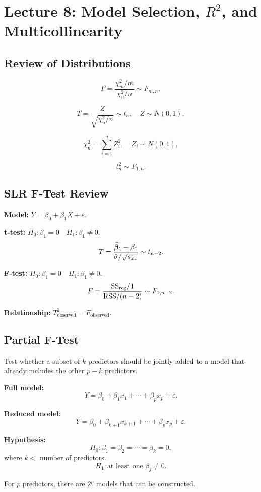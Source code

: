 \section{Lecture 8: Model Selection, $R^2$, and Multicollinearity}

\subsection{Review of Distributions}

\[
F = \frac{\chi^2_m / m}{\chi^2_n / n} \sim F_{m,n},
\]

\[
T = \frac{Z}{\sqrt{\chi^2_n / n}} \sim t_n, \quad Z \sim N(0,1),
\]

\[
\chi^2_n = \sum_{i=1}^n Z_i^2, \quad Z_i \sim N(0,1),
\]

\[
t_n^2 \sim F_{1,n}.
\]

\subsection{SLR F-Test Review}

\textbf{Model:} $Y = \beta_0 + \beta_1 X + \varepsilon$.

\textbf{t-test:} $H_0: \beta_1 = 0 \quad H_1: \beta_1 \neq 0$.
\[
T = \frac{\widehat{\boldsymbol{\beta}}_1 - \beta_1}{\hat{\sigma}/\sqrt{s_{xx}}} \sim t_{n-2}.
\]

\textbf{F-test:} $H_0: \beta_1 = 0 \quad H_1: \beta_1 \neq 0$.
\[
F = \frac{\mathrm{SS}_{\mathrm{reg}}/1}{\mathrm{RSS}/(n-2)} \sim F_{1,n-2}.
\]

\textbf{Relationship:} $T_{\text{observed}}^2 = F_{\text{observed}}$.

\subsection{Partial F-Test}

Test whether a subset of $k$ predictors should be jointly added to a model that already includes the other $p - k$ predictors.

\textbf{Full model:}
\[
Y = \beta_0 + \beta_1 x_1 + \cdots + \beta_p x_p + \varepsilon.
\]

\textbf{Reduced model:}
\[
Y = \beta_0 + \beta_{k+1} x_{k+1} + \cdots + \beta_p x_p + \varepsilon.
\]

\textbf{Hypothesis:}
\[
H_0: \beta_1 = \beta_2 = \cdots = \beta_k = 0,
\]
where $k < $ number of predictors.
\[
H_1: \text{at least one } \beta_j \neq 0.
\]

For $p$ predictors, there are $2^p$ models that can be constructed.

